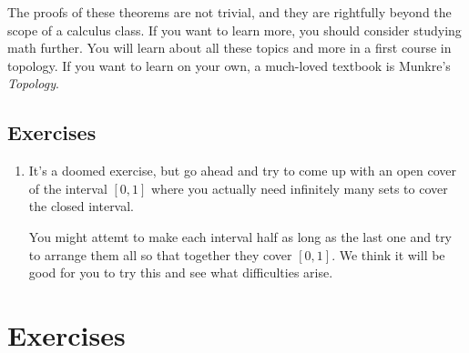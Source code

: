 \documentclass[11pt]{book}
\numberwithin{example}{chapter}
\begin{document}
The proofs of these theorems are not trivial, and they are rightfully beyond the scope of a calculus class.  If you want to learn more, you should consider studying math further.  You will learn about all these topics and more in a first course in topology.  If you want to learn on your own, a much-loved textbook is Munkre's \textit{Topology}.  

\subsection{Exercises}

\begin{enumerate}

\item
It's a doomed exercise, but go ahead and try to come up with an open cover of the interval $[0,1]$ where you actually need infinitely many sets to cover the closed interval.

You might attemt to make each interval half as long as the last one and try to arrange them all so that together they cover $[0,1]$.  We think it will be good for you to try this and see what difficulties arise.  




\end{enumerate}








\section{Exercises}
\end{document}
